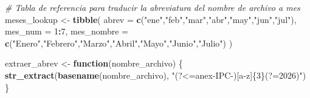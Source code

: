 \documentclass[
]{article}
\newenvironment{Shaded}{\begin{snugshade}}{\end{snugshade}}
\newcommand{\AttributeTok}[1]{\textcolor[rgb]{0.13,0.29,0.53}{#1}}
\newcommand{\CommentTok}[1]{\textcolor[rgb]{0.56,0.35,0.01}{\textit{#1}}}
\newcommand{\ControlFlowTok}[1]{\textcolor[rgb]{0.13,0.29,0.53}{\textbf{#1}}}
\newcommand{\DecValTok}[1]{\textcolor[rgb]{0.00,0.00,0.81}{#1}}
\newcommand{\FunctionTok}[1]{\textcolor[rgb]{0.13,0.29,0.53}{\textbf{#1}}}
\newcommand{\NormalTok}[1]{#1}
\newcommand{\OtherTok}[1]{\textcolor[rgb]{0.56,0.35,0.01}{#1}}
\newcommand{\SpecialCharTok}[1]{\textcolor[rgb]{0.81,0.36,0.00}{\textbf{#1}}}
\newcommand{\StringTok}[1]{\textcolor[rgb]{0.31,0.60,0.02}{#1}}
\begin{document}
\begin{Shaded}
\begin{Highlighting}[]
\CommentTok{\# Tabla de referencia para traducir la abreviatura del nombre de archivo a mes}
\NormalTok{meses\_lookup }\OtherTok{\textless{}{-}} \FunctionTok{tibble}\NormalTok{(}
  \AttributeTok{abrev      =} \FunctionTok{c}\NormalTok{(}\StringTok{"ene"}\NormalTok{,}\StringTok{"feb"}\NormalTok{,}\StringTok{"mar"}\NormalTok{,}\StringTok{"abr"}\NormalTok{,}\StringTok{"may"}\NormalTok{,}\StringTok{"jun"}\NormalTok{,}\StringTok{"jul"}\NormalTok{),}
  \AttributeTok{mes\_num    =} \DecValTok{1}\SpecialCharTok{:}\DecValTok{7}\NormalTok{,}
  \AttributeTok{mes\_nombre =} \FunctionTok{c}\NormalTok{(}\StringTok{"Enero"}\NormalTok{,}\StringTok{"Febrero"}\NormalTok{,}\StringTok{"Marzo"}\NormalTok{,}\StringTok{"Abril"}\NormalTok{,}\StringTok{"Mayo"}\NormalTok{,}\StringTok{"Junio"}\NormalTok{,}\StringTok{"Julio"}\NormalTok{)}
\NormalTok{)}

\NormalTok{extraer\_abrev }\OtherTok{\textless{}{-}} \ControlFlowTok{function}\NormalTok{(nombre\_archivo) \{}
  \FunctionTok{str\_extract}\NormalTok{(}\FunctionTok{basename}\NormalTok{(nombre\_archivo), }\StringTok{"(?\textless{}=anex{-}IPC{-})[a{-}z]\{3\}(?=2026)"}\NormalTok{)}
\NormalTok{\}}
\end{Highlighting}
\end{Shaded}
\end{document}
